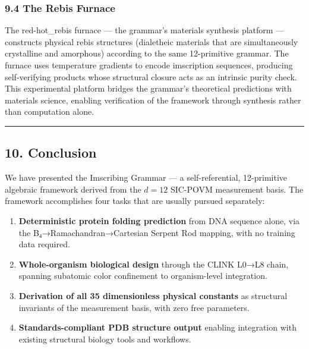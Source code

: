 \documentclass[12pt,a4paper]{article}
\begin{document}
\hypertarget{the-rebis-furnace}{%
\subsubsection{9.4 The Rebis Furnace}\label{the-rebis-furnace}}

The red-hot\_rebis furnace --- the grammar's materials synthesis
platform --- constructs physical rebis structures (dialetheic materials
that are simultaneously crystalline and amorphous) according to the same
12-primitive grammar. The furnace uses temperature gradients to encode
imscription sequences, producing self-verifying products whose
structural closure acts as an intrinsic purity check. This experimental
platform bridges the grammar's theoretical predictions with materials
science, enabling verification of the framework through synthesis rather
than computation alone.

\begin{center}\rule{0.5\linewidth}{0.5pt}\end{center}

\hypertarget{conclusion}{%
\subsection{10. Conclusion}\label{conclusion}}

We have presented the Imscribing Grammar --- a self-referential,
12-primitive algebraic framework derived from the \(d=12\) SIC-POVM
measurement basis. The framework accomplishes four tasks that are
usually pursued separately:

\begin{enumerate}
\def\labelenumi{\arabic{enumi}.}
\item
  \textbf{Deterministic protein folding prediction} from DNA sequence
  alone, via the B₄→Ramachandran→Cartesian Serpent Rod mapping, with no
  training data required.
\item
  \textbf{Whole-organism biological design} through the CLINK L0→L8
  chain, spanning subatomic color confinement to organism-level
  integration.
\item
  \textbf{Derivation of all 35 dimensionless physical constants} as
  structural invariants of the measurement basis, with zero free
  parameters.
\item
  \textbf{Standards-compliant PDB structure output} enabling integration
  with existing structural biology tools and workflows.
\end{enumerate}
\end{document}
